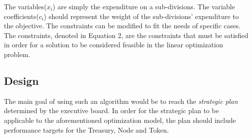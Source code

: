 \documentclass[conference,letterpaper]{IEEEtran}
\begin{document}
            The variables($x_i$) are simply the expenditure on a sub-divisions. The
            variable coefficients($c_i$) should represent the weight of the sub-divisions'
            expenditure to the objective. The constraints can be modified to fit the needs
            of specific cases. The constraints, denoted in Equation 2, are the constraints
            that must be satisfied in order for a solution to be considered feasible in
            the linear optimization problem.

        \subsection{Design}
            The main goal of using such an algorithm would be to reach the
            \textit{strategic plan} determined by the executive board. In order for the
            strategic plan to be applicable to the aforementioned optimization model, the
            plan should include performance targets for the Treasury, Node and Token.
\end{document}

